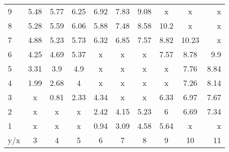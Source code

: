\begin{tabular}{| l || c | c | c | c | c | c | c | c | r |}
\hline
9   &5.48	&5.77	&6.25	&6.92	&7.83	&9.08	&x	    &x	    &x\\
8   &5.28	&5.59	&6.06	&5.88	&7.48	&8.58	&10.2	&x	    &x\\
7   &4.88	&5.23	&5.73	&6.32	&6.85	&7.57	&8.82	&10.23	&x\\
6   &4.25	&4.69	&5.37	&x	    &x	    &x	    &7.57	&8.78	&9.9\\
5   &3.31	&3.9	&4.9	&x	    &x	    &x	    &x	    &7.76	&8.84\\
4   &1.99	&2.68	&4	    &x	    &x	    &x	    &x	    &7.26	&8.14\\
3   &x	    &0.81	&2.33	&4.34	&x	    &x	    &6.33	&6.97	&7.67\\
2   &x	    &x	    &x	    &2.42	&4.15	&5.23	&6	    &6.69	&7.34\\
1   &x	    &x	    &x	    &0.94	&3.09	&4.58	&5.64	&x	    &x\\ \hline \hline
y/x &3	    &4	    &5	    &6	    &7	    &8	    &9	    &10	    &11\\ \hline
\end{tabular}